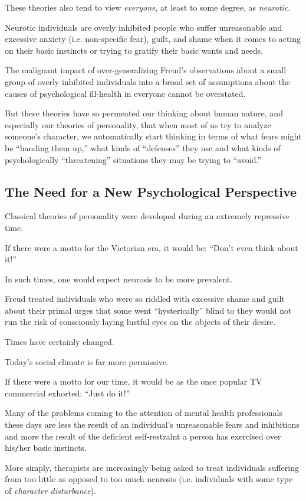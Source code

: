 \documentclass[oneside]{book}
\numberwithin{equation}{section}
\begin{document}
These theories also tend to view \textit{everyone}, at least to some degree, as \textit{neurotic}.

Neurotic individuals are overly inhibited people who suffer unreasonable and excessive anxiety (i.e. non-specific fear), guilt, and shame when it comes to acting on their basic instincts or trying to gratify their basic wants and needs.

The malignant impact of over-generalizing Freud's observations about a small group of overly inhibited individuals into a broad set of assumptions about the causes of psychological ill-health in everyone cannot be overstated.

But these theories have so permeated our thinking about human nature, and especially our theories of personality, that when most of us try to analyze someone's character, we automatically start thinking in terms of what fears might be ``handing them up,'' what kinds of ``defenses'' they use and what kinds of psychologically ``threatening'' situations they may be trying to ``avoid.''

\subsection*{The Need for a New Psychological Perspective}
Classical theories of personality were developed during an extremely repressive time.

If there were a motto for the Victorian era, it would be: ``Don't even think about it!''

In such times, one would expect neurosis to be more prevalent.

Freud treated individuals who were so riddled with excessive shame and guilt about their primal urges that some went ``hysterically'' blind to they would not run the risk of consciously laying lustful eyes on the objects of their desire.

Times have certainly changed.

Today's social climate is far more permissive.

If there were a motto for our time, it would be as the once popular TV commercial exhorted: ``Just do it!''

Many of the problems coming to the attention of mental health professionals these days are less the result of an individual's unreasonable fears and inhibitions and more the result of the deficient self-restraint a person has exercised over his\texttt{/}her basic instincts.

More simply, therapists are increasingly being asked to treat individuals suffering from too little as opposed to too much neurosis (i.e. individuals with some type of \textit{character disturbance}).
\end{document}
